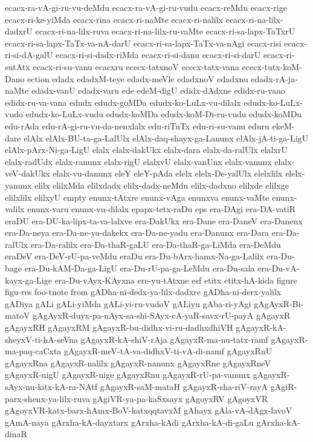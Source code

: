 {ecacx-ra-vA-gi-ru-vu-deMdu
ecacx-ra-vA-gi-ru-vudu
ecacx-reMdu
ecacx-rige
ecacx-ri-ke-yiMda
ecacx-rina
ecacx-ri-naMte
ecacx-ri-nalilx
ecacx-ri-na-lilx-dadxrU
ecacx-ri-na-lilx-ruva
ecacx-ri-na-lilx-ru-vaMte
ecacx-ri-sa-lapx-TaTxrU
ecacx-ri-sa-lapx-TaTx-va-nA-darU
ecacx-ri-sa-lapx-TaTx-va-nAgi
ecacx-risi
ecacx-ri-si-dA-galU
ecacx-ri-si-dadx-riMda
ecacx-ri-si-danu
ecacx-ri-si-darU
ecacx-ri-sutAtx
ecacx-ri-su-vanu
ecacxru
ececx-tatxnoV
ececx-tatx-vana
ececx-tutx-koM-Dano
ection
edadx
edadxM-teye
edadx-meVle
edadxnoV
edadxnu
edadx-rA-ja-naMte
edadx-vanU
edadx-varu
ede
edeM-digU
edidx-dAdxne
edidx-ru-vano
edidx-ru-va-vana
edudx
edudx-goMDa
edudx-ko-LuLx-vu-dilalx
edudx-ko-LuLx-vudo
edudx-ko-LuLx-vudu
edudx-koMDa
edudx-koM-Di-ru-vudu
edudx-koMDu
edu-rAda
edu-rA-gi-ru-vu-da-nenxlalx
edu-riTuTx
edu-ri-su-vanu
eduru
ekeM-dare
elAlx
elAlx-BU-ta-ga-LalUlx
elAlx-daq-shayx-ga-Lanunx
elAlx-jA-ti-ga-LigU
elAlx-pArx-Ni-ga-LigU
elalx
elalx-dakUkx
elalx-dara
elalx-da-ralUlx
elalxrU
elalx-radUdx
elalx-ranunx
elalx-rigU
elalxvU
elalx-vanUnx
elalx-vanunx
elalx-veV-dakUkx
elalx-vu-danunx
eleY
eleY-pAda
elelx
elelx-De-yalUlx
elelxlilx
elelx-yanunx
elilx
elilxMda
elilxdadx
elilx-dadx-neMdu
elilx-dadxno
elilxde
elilxge
elilxlilx
elilxyU
empty
enunx-tAtxre
enunx-vAga
enunxva
enunx-vaMte
enunx-valilx
enunx-varu
enunx-vu-dilalx
epapx-tetx-raDu
eps
era-DAgi
era-DA-vatiR
eraDU
era-DU-ka-lipx-ta-va-lalxve
era-DakUkx
era-Dane
era-DaneV
era-Danenx
era-Da-neya
era-Da-ne-ya-dakekx
era-Da-ne-yadu
era-Danunx
era-Dara
era-Da-ralUlx
era-Da-ralilx
era-Da-thaR-gaLU
era-Da-thaR-ga-LiMda
era-DeMdu
eraDeV
era-DeV-rU-pa-veMdu
eraDu
era-Du-bArx-hamx-Na-ga-Lalilx
era-Du-bage
era-Du-kAM-Da-ga-LigU
era-Du-rU-pa-ga-LeMdu
era-Du-sala
era-Du-vA-kayx-ga-Lige
era-Du-vAyx-KAyxna
ere-yu-tAtxne
esf
etitx
etitx-hA-kida
figure
figu-res
foo-tnote
from
gADha-ni-dedx-ya-lilx-dadxre
gADha-ni-derx-yalilx
gADiya
gALi
gALi-yiMda
gALi-yi-ru-vudoV
gALiyu
gAba-ri-yAgi
gAgAyxR-Bi-matoV
gAgAyxR-duyx-pa-nAyx-sa-shi-SAyx-cA-yaR-savx-rU-payA
gAgayxR
gAgayxRH
gAgayxRM
gAgayxR-bu-didhx-vi-ru-dadhxdhiVH
gAgayxR-kA-sheyxV-ti-hA-seVna
gAgayxR-kA-shiV-rAja
gAgayxR-ma-nu-tatx-ramf
gAgayxR-ma-paq-caCxta
gAgayxR-meV-tA-va-didhxV-ti-vA-di-namf
gAgayxRnU
gAgayxRna
gAgayxR-nalilx
gAgayxR-nanunx
gAgayxRne
gAgayxRneV
gAgayxR-nigU
gAgayxR-nige
gAgayxRnu
gAgayxR-rU-pa-vanunx
gAgayxR-sAyx-nu-kitx-kA-ra-NAtf
gAgayxR-saM-mataH
gAgayxR-sha-riV-rayA
gAgiR-parx-shenx-ya-lilx-ruva
gAgiVR-ya-pa-kaSxsayx
gAgoyxRV
gAgoyxVR
gAgoyxVR-katx-barx-hAmx-BoV-katxqqtavxM
gAhayx
gAla-vA-dAgx-lavoV
gAmA-naya
gArxha-kA-dayxtarx
gArxha-kAdi
gArxha-kA-di-gaLu
gArxha-kA-dinaR
}
